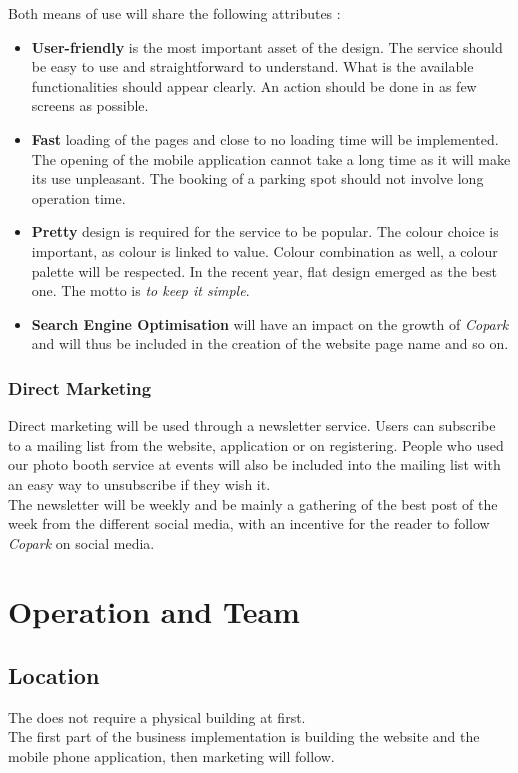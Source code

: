 \documentclass[12pt,a4paper,oneside]{book}
\newcommand{\bp}{\textit{Copark }}
\begin{document}
Both means of use will share the following attributes :
\begin{itemize}
\item \textbf{User-friendly} is the most important asset of the design. The service should be easy to use and straightforward to understand. What is the available functionalities should appear clearly. An action should be done in as few screens as possible.
\item \textbf{Fast} loading of the pages and close to no loading time will be implemented. The opening of the mobile application cannot take a long time as it will make its use unpleasant. The booking of a parking spot should not involve long operation time.
\item \textbf{Pretty} design is required for the service to be popular. The colour choice is important, as colour is linked to value. Colour combination as well, a colour palette will be respected. In the recent year, flat design emerged as the best one. The motto is \textit{to keep it simple}.
\item \textbf{Search Engine Optimisation} will have an impact on the growth of \bp and will thus be included in the creation of the website page name and so on.
\end{itemize}

\subsection{Direct Marketing}

Direct marketing will be used through a newsletter service. Users can subscribe to a mailing list from the website, application or on registering. People who used our photo booth service at events will also be included into the mailing list with an easy way to unsubscribe if they wish it.\\
The newsletter will be weekly and be mainly a gathering of the best post of the week from the different social media, with an incentive for the reader to follow \bp on social media.

\chapter{Operation and Team}

\section{Location}
The does not require a physical building at first.\\
The first part of the business implementation is building the website and the mobile phone application, then marketing will follow.\\
\end{document}
